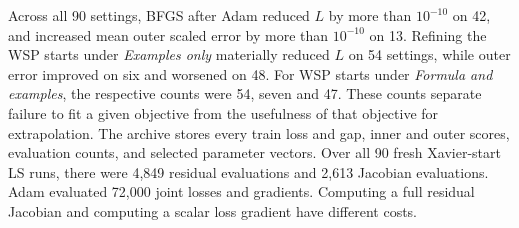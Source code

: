 Across all 90 settings, BFGS after Adam reduced $L$ by more than $10^{-10}$ on 42, and increased mean outer scaled error by more than $10^{-10}$ on 13. Refining the WSP starts under \emph{Examples only} materially reduced $L$ on 54 settings, while outer error improved on six and worsened on 48. For WSP starts under \emph{Formula and examples}, the respective counts were 54, seven and 47. These counts separate failure to fit a given objective from the usefulness of that objective for extrapolation. The archive stores every train loss and gap, inner and outer scores, evaluation counts, and selected parameter vectors. Over all 90 fresh Xavier-start LS runs, there were 4,849 residual evaluations and 2,613 Jacobian evaluations. Adam evaluated 72,000 joint losses and gradients. Computing a full residual Jacobian and computing a scalar loss gradient have different costs.
